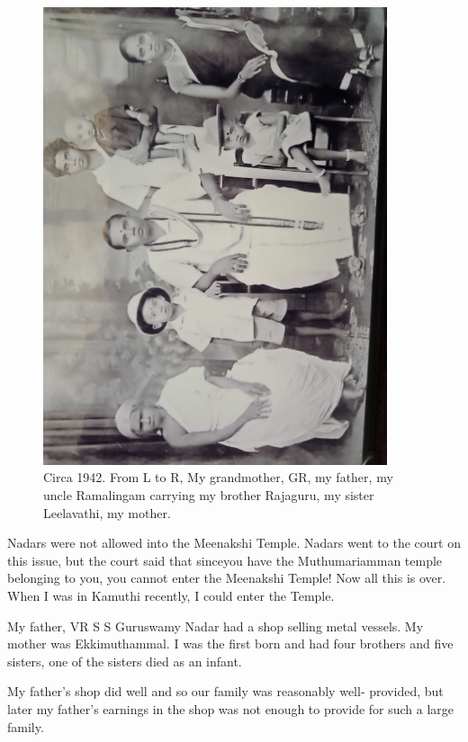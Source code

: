 \begin{figure}[H]
\centering 
\includegraphics[angle=270, width=0.9\textwidth]{images/Rajaji-01.jpg}
\caption{\small{Circa 1942. From L to R, My grandmother, GR, my father, 
my uncle Ramalingam carrying my brother Rajaguru, my sister
Leelavathi, my mother.}}
\end{figure}

Nadars were not allowed into the Meenakshi Temple. Nadars went to the 
court on this issue, but the court said that since\break you have the 
Muthumariamman temple belonging to you, you cannot enter the Meenakshi 
Temple! Now all this is over. When I was in Kamuthi recently, I could 
enter the Temple.

My father, VR S S Guruswamy Nadar had a shop selling metal vessels. My 
mother was Ekkimuthammal. I was the first born and had four brothers and 
five sisters, one of the sisters died as an infant.

My father's shop did well and so our family was reasonably well- 
provided, but later my father's earnings in the shop was not enough to 
provide for such a large family.


